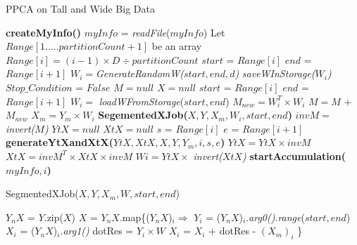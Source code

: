 \documentclass[10pt,conference,letterpaper]{IEEEtran}
\begin{document}
\newcommand\tab[1][.5cm]{\hspace*{#1}}
\begin{algorithm} [!htbp]
	\label{tallnwide}
  \caption{PPCA on Tall and Wide Big Data}
  \begin{algorithmic}[1]
  \State \textbf{createMyInfo()}
  \State $myInfo$ = \textit{readFile}($myInfo$)
  \State Let $Range[1.....partitionCount+1]$ be an array %
  	\State $Range[i] = (i-1)\times D \div partitionCount$
  \EndFor
  		\State $start$ = $Range[i]$  
		\State $end$ = $Range[i+1]$ 
		\State $W_i = $\textit{GenerateRandomW($start, end, d$)}
		\State \textit{saveWInStorage($W_i$)}
  \EndFor
  \State $Stop\_Condition$ = $False$
  	  \State $M = null$ 
  \State $X = null$
		\State $start$ = $Range[i]$  
		\State $end$ = $Range[i+1]$  
		\State $W_i =$ \textit{loadWFromStorage}($start, end$)
		\State $M_{new} = W_i^T \times W_i$
		\State $M = M$ + $M_{new}$
		\State $X_m = Y_m \times W_i$
		\State \textbf{SegementedXJob($X, Y, X_m, W_i, start, end$)}
	\EndFor
	\State $invM = $\textit{invert($M$)}
	\State $YtX = null$
	\State $XtX = null$
		\State $s$ = $Range[i]$  
		\State $e$ = $Range[i+1]$  
		\State \textbf{generateYtXandXtX($YtX,XtX,X,Y,Y_m,i,s,e$)}
		\State $YtX = YtX \times invM$
		\State $XtX = invM^T \times XtX \times invM$
		\State $Wi = YtX \times $ \textit{invert($XtX$)}
		\State \textbf{startAccumulation($myInfo, i$)}
	\EndFor
  \EndWhile
  \end{algorithmic}
\end{algorithm}

\begin{algorithm} [!htbp]
\label{segmented1}
  \caption{SegmentedXJob($X,Y,X_m,W,start,end$)}
  \begin{algorithmic} [1]
	\State $Y_nX$ = $Y$.zip($X$)
	\State $X$ = $Y_nX$.map\{($Y_nX$)$_i \Rightarrow$
	        \State \tab $Y_i$ = ($Y_nX$)$_i$.\textit{arg0()}.\textit{range}($start,end$)
			\State \tab $X_i$ = ($Y_nX$)$_i$.\textit{arg1()}
			\State \tab dotRes = $Y_i \times W$
			\State \tab $X_i$ = $X_i$ + dotRes - $(X_m)_i$
			\State \}
  \end{algorithmic}
\end{algorithm}
\end{document}
